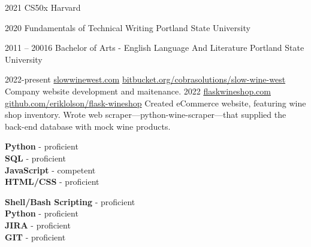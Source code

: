 \documentclass[9pt]{developercv} %
\begin{document}
\begin{entrylist}
	\entry
		{2021}
		{CS50x}
		{Harvard}
		
	\entry
		{2020}
		{Fundamentals of Technical Writing}
		{Portland State University}

	\entry
		{2011 -- 20016}
		{Bachelor of Arts - English Language And Literature}
		{Portland State University}

\end{entrylist}
\begin{entrylist}
	\entry
		{2022-present}
		{\href{https://slowwinewest.com}{slowwinewest.com}}
		{\href{https://bitbucket.org/cobrasolutions/slow-wine-west}{bitbucket.org/cobrasolutions/slow-wine-west}}
		{Company website development and maitenance.}
	\entry
		{2022}
		{\href{https://flaskwineshop.com}{flaskwineshop.com}}
		{\href{https://github.com/eriklolson/flask-wineshop}{github.com/eriklolson/flask-wineshop}}
 		{Created eCommerce website, featuring wine shop inventory. Wrote web scraper—python-wine-scraper—that 
 		supplied the back-end database with mock wine products.}
\end{entrylist}
\begin{minipage}[t]{0.3\textwidth}
	\vspace{-\baselineskip} %

	\textbf{Python} - proficient\\
	\textbf{SQL} - proficient\\
	\textbf{JavaScript} - competent\\
	\textbf{HTML/CSS} - proficient\\
\end{minipage}
\hfill
\begin{minipage}[t]{0.3\textwidth}
	\vspace{-\baselineskip} %
	
	\textbf{Shell/Bash Scripting} - proficient\\
	\textbf{Python} - proficient\\
	\textbf{JIRA} - proficient\\
	\textbf{GIT} - proficient\\
\end{minipage}
\end{document}
